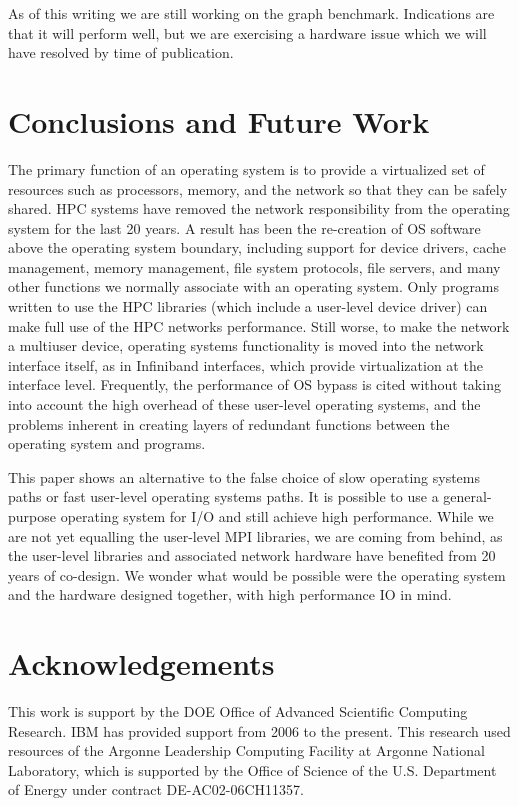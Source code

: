 \documentclass[letterpaper,twocolumn,10pt]{article}
\begin{document}
As of this writing we are still working on the graph benchmark. Indications are that it will perform well, but we are exercising a hardware issue which we will have resolved by time of publication. 

\section{Conclusions and Future Work}
The primary function of an operating system is to provide a virtualized set of resources such 
as processors, memory, and the network so that they can be safely shared. 
HPC systems have removed the network responsibility from the operating system for the 
last 20 years. A result has been  the re-creation of OS software above the operating system boundary, including support for device drivers, cache management, memory management, file system protocols, file servers, and many other functions we normally associate with an operating system. 
Only programs written to use the HPC libraries (which include a user-level device driver) 
can make full use of the HPC networks performance\cite{zhang2008design}. 
Still worse, to make the network a multiuser device, operating systems 
functionality is moved into the network interface itself, as in Infiniband interfaces, which provide virtualization at the interface level. 
Frequently, the performance of OS bypass is cited without taking into account the high overhead of these user-level operating systems, and the problems inherent in creating layers of redundant functions between the operating system and programs. 

This paper shows an alternative to the false choice of slow operating systems paths or fast user-level operating systems paths. It is possible to use a general-purpose operating system for I/O and still achieve high performance. While we are not yet equalling the user-level MPI libraries, we are coming from behind, as the user-level libraries and associated network hardware have benefited from 20 years of co-design. 
We wonder what would be possible were the operating system and the hardware designed together, with high performance IO in mind. 

\section{Acknowledgements}
This work is support by the DOE Office of Advanced Scientific Computing Research. IBM has provided support from 2006 to the present. This research used resources of the Argonne Leadership Computing Facility
 at Argonne National Laboratory, which is supported by the Office of Science
 of the U.S.
 Department of Energy under contract DE-AC02-06CH11357.

 

\end{document}
